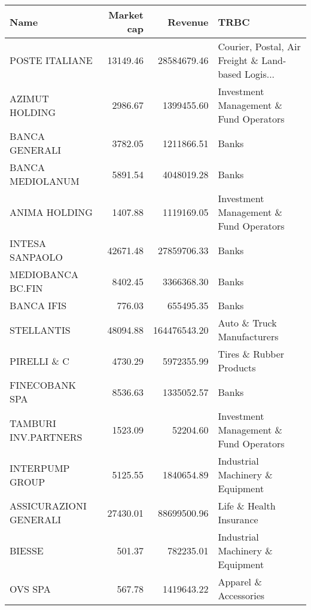 \begin{tabular}{lrrl}
\toprule
                  Name &  Market cap &      Revenue &                                               TRBC \\
\midrule
        POSTE ITALIANE &    13149.46 &  28584679.46 & Courier, Postal, Air Freight \& Land-based Logis... \\
        AZIMUT HOLDING &     2986.67 &   1399455.60 &             Investment Management \& Fund Operators \\
        BANCA GENERALI &     3782.05 &   1211866.51 &                                              Banks \\
      BANCA MEDIOLANUM &     5891.54 &   4048019.28 &                                              Banks \\
         ANIMA HOLDING &     1407.88 &   1119169.05 &             Investment Management \& Fund Operators \\
       INTESA SANPAOLO &    42671.48 &  27859706.33 &                                              Banks \\
     MEDIOBANCA BC.FIN &     8402.45 &   3366368.30 &                                              Banks \\
            BANCA IFIS &      776.03 &    655495.35 &                                              Banks \\
            STELLANTIS &    48094.88 & 164476543.20 &                         Auto \& Truck Manufacturers \\
           PIRELLI \& C &     4730.29 &   5972355.99 &                            Tires \& Rubber Products \\
        FINECOBANK SPA &     8536.63 &   1335052.57 &                                              Banks \\
  TAMBURI INV.PARTNERS &     1523.09 &     52204.60 &             Investment Management \& Fund Operators \\
       INTERPUMP GROUP &     5125.55 &   1840654.89 &                   Industrial Machinery \& Equipment \\
ASSICURAZIONI GENERALI &    27430.01 &  88699500.96 &                            Life \& Health Insurance \\
                BIESSE &      501.37 &    782235.01 &                   Industrial Machinery \& Equipment \\
               OVS SPA &      567.78 &   1419643.22 &                              Apparel \& Accessories \\

\end{tabular}
